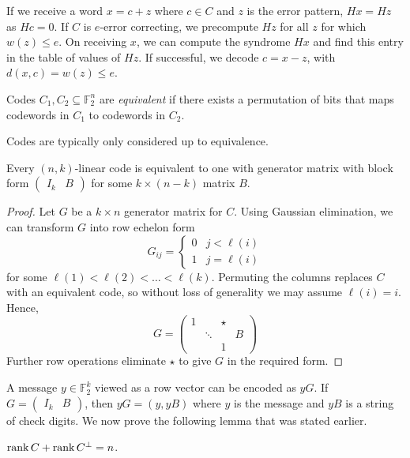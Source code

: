 If we receive a word \( x = c + z \) where \( c \in C \) and \( z \) is the error pattern, \( Hx = Hz \) as \( Hc = 0 \).
If \( C \) is \( e \)-error correcting, we precompute \( Hz \) for all \( z \) for which \( w(z) \leq e \).
On receiving \( x \), we can compute the syndrome \( Hx \) and find this entry in the table of values of \( Hz \).
If successful, we decode \( c = x - z \), with \( d(x,c) = w(z) \leq e \).
\begin{definition}
    Codes \( C_1, C_2 \subseteq \mathbb F_2^n \) are \emph{equivalent} if there exists a permutation of bits that maps codewords in \( C_1 \) to codewords in \( C_2 \).
\end{definition}
Codes are typically only considered up to equivalence.
\begin{lemma}
    Every \( (n, k) \)-linear code is equivalent to one with generator matrix with block form \( \begin{pmatrix}
        I_k & B
    \end{pmatrix} \) for some \( k \times (n - k) \) matrix \( B \).
\end{lemma}
\begin{proof}
    Let \( G \) be a \( k \times n \) generator matrix for \( C \).
    Using Gaussian elimination, we can transform \( G \) into row echelon form
    \[ G_{ij} = \begin{cases}
        0 & j < \ell(i) \\
        1 & j = \ell(i)
    \end{cases} \]
    for some \( \ell(1) < \ell(2) < \dots < \ell(k) \).
    Permuting the columns replaces \( C \) with an equivalent code, so without loss of generality we may assume \( \ell(i) = i \).
    Hence,
    \[ G = \begin{pmatrix}
        1 & & \star \\
        & \ddots & & B \\
        & & 1
    \end{pmatrix} \]
    Further row operations eliminate \( \star \) to give \( G \) in the required form.
\end{proof}
A message \( y \in \mathbb F_2^k \) viewed as a row vector can be encoded as \( yG \).
If \( G = \begin{pmatrix}
    I_k & B
\end{pmatrix} \), then \( yG = (y, yB) \) where \( y \) is the message and \( yB \) is a string of check digits.
We now prove the following lemma that was stated earlier.
\begin{lemma}
    \( \rank C + \rank C^\perp = n \).
\end{lemma}
